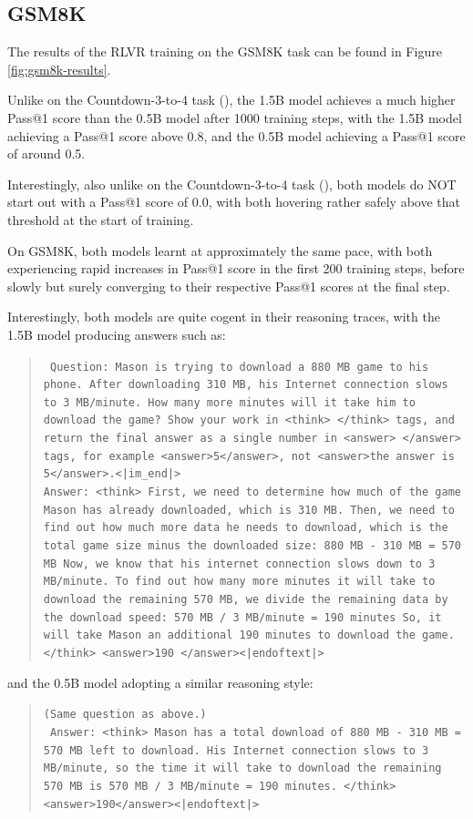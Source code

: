 \documentclass{article} %
\theoremstyle{definition}
\begin{document}
\subsection{GSM8K}
The results of the RLVR training on the GSM8K task can be found in Figure \ref{fig:gsm8k-results}.

Unlike on the Countdown-3-to-4 task (\cite{countdown}), the 1.5B model achieves a much higher Pass@1 score
than the 0.5B model after 1000 training steps, with the 1.5B model achieving a Pass@1 score above 0.8,
and the 0.5B model achieving a Pass@1 score of around 0.5.

Interestingly, also unlike on the Countdown-3-to-4 task (\cite{countdown}), 
both models do NOT start out with a Pass@1 score of 0.0, with both hovering rather safely
above that threshold at the start of training.

On GSM8K, both models learnt at approximately the same pace, with both experiencing
rapid increases in Pass@1 score in the first 200 training steps,
before slowly but surely converging to their respective Pass@1 scores at the final step.

Interestingly, both models are quite cogent in their reasoning traces,
with the 1.5B model producing answers such as:
\begin{quote}
    \texttt{
        Question: Mason is trying to download a 880 MB game to his phone. After downloading 310 MB, his Internet connection slows to 3 MB/minute. How many more minutes will it take him to download the game? Show your work in <think> </think> tags, and return the final answer as a single number in <answer> </answer> tags, for example <answer>5</answer>, not <answer>the answer is 5</answer>.<|im\_end|>
    } \\
    \texttt{Answer: <think>
        First, we need to determine how much of the game Mason has already downloaded, which is 310 MB.
        Then, we need to find out how much more data he needs to download, which is the total game size minus the downloaded size: 880 MB - 310 MB = 570 MB
        Now, we know that his internet connection slows down to 3 MB/minute. To find out how many more minutes it will take to download the remaining 570 MB, we divide the remaining data by the download speed: 570 MB / 3 MB/minute = 190 minutes
        So, it will take Mason an additional 190 minutes to download the game.
        </think>
        <answer>190 </answer><|endoftext|>
    }
\end{quote}

and the 0.5B model adopting a similar reasoning style:
\begin{quote}
    \texttt{(Same question as above.)} \\
    \texttt{
        Answer: <think>
         Mason has a total download of 880 MB - 310 MB = 570 MB left to download. His Internet connection slows to 3 MB/minute, so the time it will take to download the remaining 570 MB is 570 MB / 3 MB/minute = 190 minutes. </think>
<answer>190</answer><|endoftext|>
    }
\end{quote}
\end{document}
